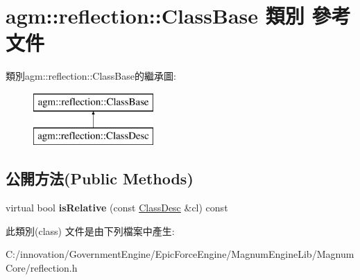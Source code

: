 \hypertarget{classagm_1_1reflection_1_1_class_base}{}\section{agm\+:\+:reflection\+:\+:Class\+Base 類別 參考文件}
\label{classagm_1_1reflection_1_1_class_base}
類別agm\+:\+:reflection\+:\+:Class\+Base的繼承圖\+:\begin{figure}[H]
\begin{center}
\leavevmode
\includegraphics[height=2.000000cm]{classagm_1_1reflection_1_1_class_base}
\end{center}
\end{figure}
\subsection*{公開方法(Public Methods)}
\begin{DoxyCompactItemize}
\item 
virtual bool {\bfseries is\+Relative} (const \hyperlink{classagm_1_1reflection_1_1_class_desc}{Class\+Desc} \&cl) const \hypertarget{classagm_1_1reflection_1_1_class_base_a044ae7d50be9f265af2fe791c57f77c1}{}\label{classagm_1_1reflection_1_1_class_base_a044ae7d50be9f265af2fe791c57f77c1}

\end{DoxyCompactItemize}


此類別(class) 文件是由下列檔案中產生\+:\begin{DoxyCompactItemize}
\item 
C\+:/innovation/\+Government\+Engine/\+Epic\+Force\+Engine/\+Magnum\+Engine\+Lib/\+Magnum\+Core/reflection.\+h\end{DoxyCompactItemize}

